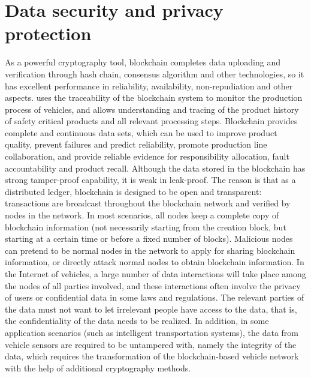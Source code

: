 \section{Data security and privacy protection }

As a powerful cryptography tool, blockchain completes data uploading and verification through hash chain, consensus algorithm and other technologies, so it has excellent performance in reliability, availability, non-repudiation and other aspects. \cite{ref37} uses the traceability of the blockchain system to monitor the production process of vehicles, and allows understanding and tracing of the product history of safety critical products and all relevant processing steps. Blockchain provides complete and continuous data sets, which can be used to improve product quality, prevent failures and predict reliability, promote production line collaboration, and provide reliable evidence for responsibility allocation, fault accountability and product recall.
Although the data stored in the blockchain has strong tamper-proof capability, it is weak in leak-proof.
The reason is that as a distributed ledger, blockchain is designed to be open and transparent: transactions are broadcast throughout the blockchain network and verified by nodes in the network.
In most scenarios, all nodes keep a complete copy of blockchain information (not necessarily starting from the creation block, but starting at a certain time or before a fixed number of blocks).
Malicious nodes can pretend to be normal nodes in the network to apply for sharing blockchain information, or directly attack normal nodes to obtain blockchain information.
In the Internet of vehicles, a large number of data interactions will take place among the nodes of all parties involved, and these interactions often involve the privacy of users or confidential data in some laws and regulations. The relevant parties of the data must not want to let irrelevant people have access to the data, that is, the confidentiality of the data needs to be realized.
In addition, in some application scenarios (such as intelligent transportation systems), the data from vehicle sensors are required to be untampered with, namely the integrity of the data, which requires the transformation of the blockchain-based vehicle network with the help of additional cryptography methods.



